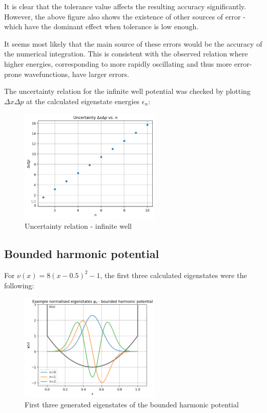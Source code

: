 \documentclass[11pt]{article}
\begin{document}
It is clear that the tolerance value affects the resulting accuracy significantly.
However, the above figure also shows the existence of other sources of error - 
which have the dominant effect when tolerance is low enough.

It seems most likely that the main source of these errors would be the accuracy of
the numerical integration. This is consistent with the observed relation where 
higher energies, corresponding to more rapidly oscillating and thus more error-prone
wavefunctions, have larger errors.

The uncertainty relation for the infinite well potential was checked by plotting 
$\Delta x \Delta p$ at the calculated eigenstate energies $\epsilon_n$:

\begin{figure}[h]
  \centering
  \includegraphics*[width=0.6\textwidth]{uncertainty1.png}
  \caption{Uncertainty relation - infinite well}
\end{figure}

\subsection{Bounded harmonic potential}

For $\nu(x)=8(x-0.5)^2-1$, the first three calculated eigenstates were the following:

\begin{figure}[h]
  \centering
  \includegraphics[width=0.6\textwidth]{ex_eigenstates2.png}
  \caption{First three generated eigenstates of the bounded harmonic potential}
\end{figure}
\end{document}
